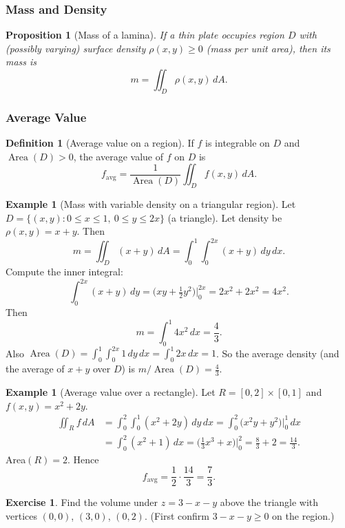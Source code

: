 \documentclass[12pt]{article}
\numberwithin{equation}{section}
\theoremstyle{plain}
\newtheorem{proposition}[theorem]{Proposition}
\theoremstyle{definition}
\newtheorem{definition}[theorem]{Definition}
\newtheorem{example}[theorem]{Example}
\newtheorem{exercise}[theorem]{Exercise}
\theoremstyle{remark}
\begin{document}
\subsubsection{Mass and Density}

\begin{proposition}[Mass of a lamina]\label{prop:mass}
If a thin plate occupies region $D$ with (possibly varying) surface density $\rho(x,y)\ge 0$ (mass per unit area), then its mass is
\[
m=\iint_D \rho(x,y)\,dA.
\]
\end{proposition}

\subsubsection{Average Value}

\begin{definition}[Average value on a region]\label{def:avg-value}
If $f$ is integrable on $D$ and $\operatorname{Area}(D)>0$, the average value of $f$ on $D$ is
\[
f_{\text{avg}}=\frac{1}{\operatorname{Area}(D)}\iint_D f(x,y)\,dA.
\]
\end{definition}

\begin{example}[Mass with variable density on a triangular region]
Let $D=\{(x,y): 0\le x\le 1,\ 0\le y\le 2x\}$ (a triangle).
Let density be $\rho(x,y)=x+y$. Then
\[
m=\iint_D (x+y)\,dA=\int_{0}^{1}\int_{0}^{2x} (x+y)\,dy\,dx.
\]
Compute the inner integral:
\[
\int_{0}^{2x}(x+y)\,dy=\Big(xy+\tfrac12 y^2\Big)\Big|_{0}^{2x}=2x^2+2x^2=4x^2.
\]
Then
\[
m=\int_{0}^{1}4x^2\,dx=\frac{4}{3}.
\]
Also $\operatorname{Area}(D)=\int_{0}^{1}\int_{0}^{2x}1\,dy\,dx=\int_{0}^{1}2x\,dx=1$.
So the average density (and the average of $x+y$ over $D$) is $m/\operatorname{Area}(D)=\frac{4}{3}$.
\end{example}

\begin{example}[Average value over a rectangle]
Let $R=[0,2]\times[0,1]$ and $f(x,y)=x^2+2y$.
\begin{align*}
\iint_R f\,dA &= \int_{0}^{2}\int_{0}^{1}(x^2+2y)\,dy\,dx 
= \int_{0}^{2}\Big(x^2y+y^2\Big)\Big|_{0}^{1}\,dx \\
&= \int_{0}^{2}(x^2+1)\,dx 
= \Big(\tfrac13 x^3+x\Big)\Big|_{0}^{2}
= \frac{8}{3}+2=\frac{14}{3}.
\end{align*}
Area$(R)=2$. Hence
\[
f_{\text{avg}}=\frac{1}{2}\cdot\frac{14}{3}=\frac{7}{3}.
\]
\end{example}

\begin{exercise}
Find the volume under $z=3-x-y$ above the triangle with vertices $(0,0)$, $(3,0)$, $(0,2)$.
(First confirm $3-x-y\ge0$ on the region.)
\end{exercise}
\end{document}
